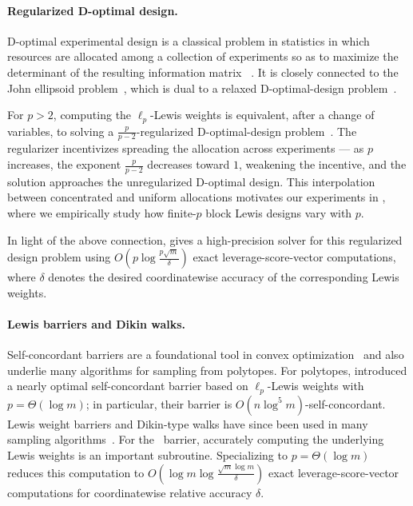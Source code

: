\documentclass[11pt]{article}
\theoremstyle{plain}
\numberwithin{equation}{section}
\begin{document}
\paragraph{Regularized D-optimal design.}
D-optimal experimental design is a classical problem in statistics  in which resources are allocated among a collection of experiments so as to maximize the determinant of the resulting information matrix ~\cite{pukelsheim2006optimal,pmlr-v70-allen-zhu17e,pmlr-v99-madan19a,singh2020approximation}. 
It is closely connected to the John ellipsoid problem~\cite{john1948extremum}, which is dual to a relaxed D-optimal-design problem~\cite{Todd2016}. 

For $p>2$, computing the $\ell_p$-Lewis weights is equivalent, after a change of variables, to solving a $\frac{p}{p-2}$-regularized D-optimal-design problem~\cite{cohen2015lp,lee2019solving,fazel2022computing}. 
The regularizer incentivizes spreading the allocation across experiments ---  as $p$ increases, the exponent $\frac{p}{p-2}$ decreases toward $1$, weakening the incentive, and the solution approaches the unregularized D-optimal design. 
This  interpolation between concentrated and uniform allocations motivates our experiments in , where we empirically study how finite-$p$ block Lewis designs vary with $p$.

In light of the above connection,  gives a high-precision solver for this regularized design problem using $
O\left(p\log\frac{p\sqrt m}{\delta}\right)$ 
exact leverage-score-vector computations, where $\delta$ denotes the desired coordinatewise accuracy of the corresponding Lewis weights. 

\paragraph{Lewis barriers and Dikin walks.}
Self-concordant barriers are a foundational tool in convex optimization~\cite{nesterov1994interior} and also underlie many algorithms for sampling from polytopes. 
For polytopes, \cite{lee2019solving} introduced a nearly optimal self-concordant barrier based on $\ell_p$-Lewis weights with $p=\Theta(\log m)$; in particular, their barrier is $O(n\log^5 m)$-self-concordant. Lewis weight barriers and Dikin-type walks have since been used in many sampling algorithms~\cite{laddha2020strong,gatmiry2023sampling,jiang2024regularized,kook2024gaussian}. For the~\cite{lee2019solving} barrier, accurately computing the underlying Lewis weights is an important subroutine. Specializing  to $p=\Theta(\log m)$ reduces this computation to 
$O\left(\log m\log\frac{\sqrt m\log m}{\delta}\right)$
exact leverage-score-vector computations for coordinatewise relative accuracy $\delta$. 
\end{document}
